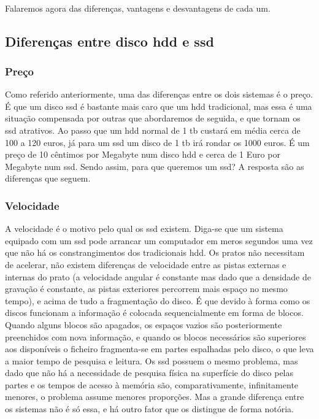 \documentclass[a4paper]{report}
\begin{document}
\newpage

\paragraph*{} Falaremos agora das diferenças, vantagens e desvantagens de cada um.

\subsection{Diferenças entre disco \ac{hdd} e \ac{ssd}}

\subsubsection*{Preço}

Como referido anteriormente, uma das diferenças entre os dois sistemas é o preço. É que um disco \ac{ssd} é bastante mais caro que um \ac{hdd} tradicional, mas essa é uma situação compensada por outras que abordaremos de seguida, e que tornam os \ac{ssd} atrativos.
Ao passo que um \ac{hdd} normal de 1 \ac{tb} custará em média cerca de 100 a 120 euros, já para um \ac{ssd} um disco de 1 \ac{tb} irá rondar os 1000 euros. É um preço de 10 cêntimos por Megabyte num disco \ac{hdd} e cerca de 1 Euro por Megabyte num \ac{ssd}. 
Sendo assim, para que queremos um \ac{ssd}? A resposta são as diferenças que seguem.

\subsubsection*{Velocidade}

A velocidade é o motivo pelo qual os \ac{ssd} existem. Diga-se que um sistema equipado com um \ac{ssd} pode arrancar um computador em meros segundos uma vez que não há os constrangimentos dos tradicionais \ac{hdd}. Os pratos não necessitam de acelerar, não existem diferenças de velocidade entre as pistas externas e internas do prato (a velocidade angular é constante mas dado que a densidade de gravação é constante, as pistas exteriores percorrem mais espaço no mesmo tempo), e acima de tudo a fragmentação do disco.
É que devido à forma como os discos funcionam a informação é colocada sequencialmente em forma de blocos. Quando alguns blocos são apagados, os espaços vazios são posteriormente preenchidos com nova informação, e quando os blocos necessários são superiores aos disponíveis o ficheiro fragmenta-se em partes espalhadas pelo disco, o que leva a maior tempo de pesquisa e leitura.
Os \ac{ssd} possuem o mesmo problema, mas dado que não há a necessidade de pesquisa física na superfície do disco pelas partes e os tempos de acesso à memória são, comparativamente, infinitamente menores, o problema assume menores proporções.
Mas a grande diferença entre os sistemas não é só essa, e há outro fator que os distingue de forma notória.
\end{document}
